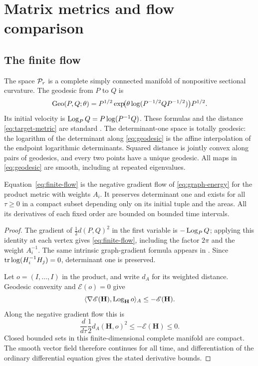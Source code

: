 \section{Matrix metrics and flow comparison}\label{sec:matrix}

\subsection{The finite flow}
The space $\mathcal P_r$ is a complete simply connected manifold of
nonpositive sectional curvature. The geodesic from $P$ to $Q$ is
\begin{equation}\label{eq:geodesic}
 \operatorname{Geo}(P,Q;\theta)=P^{1/2}
   \exp\!\bigl(\theta\log(P^{-1/2}QP^{-1/2})\bigr)P^{1/2}.
\end{equation}
Its initial velocity is
$\operatorname{Log}_PQ=P\log(P^{-1}Q)$. These formulas and the distance
\eqref{eq:target-metric} are standard \cite[Sections~2.3--2.6]{bhatia}.
The determinant-one space is totally geodesic: the logarithm of the
determinant along \eqref{eq:geodesic} is the affine interpolation of
the endpoint logarithmic determinants. Squared distance is jointly
convex along pairs of geodesics, and every two points have a unique
geodesic. All maps in \eqref{eq:geodesic} are smooth, including at
repeated eigenvalues.

\begin{lemma}\label{lem:finite-flow}
Equation~\eqref{eq:finite-flow} is the negative gradient flow of
\eqref{eq:graph-energy} for the product metric with weights $A_i$.
It preserves determinant one and exists for all $\tau\ge0$ in a
compact subset depending only on its initial tuple and the areas.
All its derivatives of each fixed order are bounded on bounded
time intervals.
\end{lemma}
\begin{proof}
The gradient of $\frac12d(P,Q)^2$ in the first variable is
$-\operatorname{Log}_PQ$; applying this identity at each vertex gives
\eqref{eq:finite-flow}, including the factor $2\pi$ and the weight
$A_i^{-1}$. The same intrinsic graph-gradient formula appears in
\cite[Section~III]{tav}.
Since $\operatorname{tr}\log(H_i^{-1}H_j)=0$, determinant one is preserved.

Let $o=(I,\ldots,I)$ in the product, and write $d_A$ for its weighted
distance. Geodesic convexity and $\mathscr E(o)=0$ give
\[
 \langle\nabla\mathscr E(\mathbf H),\operatorname{Log}_{\mathbf H}o\rangle_A
 \le-\mathscr E(\mathbf H).
\]
Along the negative gradient flow this is
\[
 \frac d{d\tau}\frac12d_A(\mathbf H,o)^2
 \le-\mathscr E(\mathbf H)\le0.
\]
Closed bounded sets in this finite-dimensional complete manifold are
compact. The smooth vector field therefore continues for all time,
and differentiation of the ordinary differential equation gives the
stated derivative bounds.
\end{proof}

